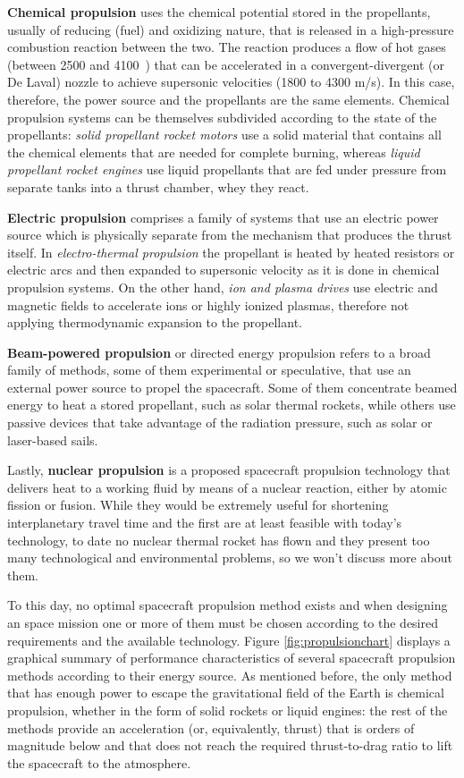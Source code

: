\textbf{Chemical propulsion} uses the chemical potential stored in the propellants, usually of reducing (fuel) and oxidizing nature, that is released in a high-pressure combustion reaction between the two. The reaction produces a flow of hot gases (between 2500 and 4100~\celsius) that can be accelerated in a convergent-divergent (or De Laval) nozzle to achieve supersonic velocities (1800 to 4300 m/s). In this case, therefore, the power source and the propellants are the same elements. Chemical propulsion systems can be themselves subdivided according to the state of the propellants: \textit{solid propellant rocket motors} use a solid material that contains all the chemical elements that are needed for complete burning, whereas \textit{liquid propellant rocket engines} use liquid propellants that are fed under pressure from separate tanks into a thrust chamber, whey they react.

\textbf{Electric propulsion} comprises a family of systems that use an electric power source which is physically separate from the mechanism that produces the thrust itself. In \textit{electro-thermal propulsion} the propellant is heated by heated resistors or electric arcs and then expanded to supersonic velocity as it is done in chemical propulsion systems. On the other hand, \textit{ion and plasma drives} use electric and magnetic fields to accelerate ions or highly ionized plasmas, therefore not applying thermodynamic expansion to the propellant.

\textbf{Beam-powered propulsion} or directed energy propulsion refers to a broad family of methods, some of them experimental or speculative, that use an external power source to propel the spacecraft. Some of them concentrate beamed energy to heat a stored propellant, such as solar thermal rockets, while others use passive devices that take advantage of the radiation pressure, such as solar or laser-based sails.

Lastly, \textbf{nuclear propulsion} is a proposed spacecraft propulsion technology that delivers heat to a working fluid by means of a nuclear reaction, either by atomic fission or fusion. While they would be extremely useful for shortening interplanetary travel time and the first are at least feasible with today's technology, to date no nuclear thermal rocket has flown and they present too many technological and environmental problems, so we won't discuss more about them.

To this day, no optimal spacecraft propulsion method exists and when designing an space mission one or more of them must be chosen according to the desired requirements and the available technology. Figure \ref{fig:propulsionchart} displays a graphical summary of performance characteristics of several spacecraft propulsion methods according to their energy source. As mentioned before, the only method that has enough power to escape the gravitational field of the Earth is chemical propulsion, whether in the form of solid rockets or liquid engines: the rest of the methods provide an acceleration (or, equivalently, thrust) that is orders of magnitude below and that does not reach the required thrust-to-drag ratio to lift the spacecraft to the atmosphere.


